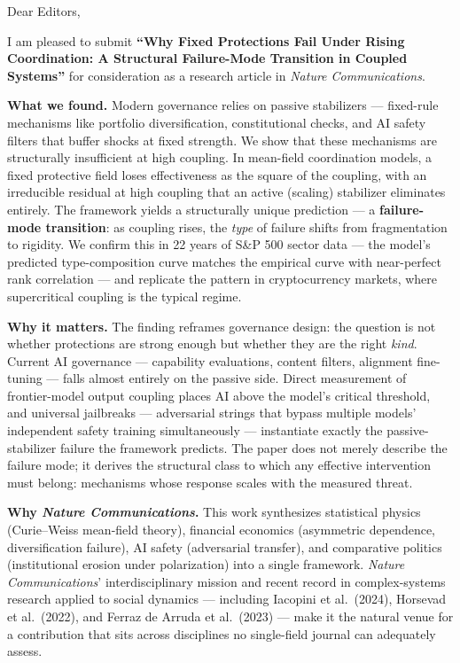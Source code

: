 \documentclass[10pt,letterpaper]{article}
\begin{document}
Dear Editors,

I am pleased to submit \textbf{``Why Fixed Protections Fail Under Rising Coordination: A Structural Failure-Mode Transition in Coupled Systems''} for consideration as a research article in \emph{Nature Communications}.

\textbf{What we found.} Modern governance relies on passive stabilizers --- fixed-rule mechanisms like portfolio diversification, constitutional checks, and AI safety filters that buffer shocks at fixed strength. We show that these mechanisms are structurally insufficient at high coupling. In mean-field coordination models, a fixed protective field loses effectiveness as the square of the coupling, with an irreducible residual at high coupling that an active (scaling) stabilizer eliminates entirely. The framework yields a structurally unique prediction --- a \textbf{failure-mode transition}: as coupling rises, the \emph{type} of failure shifts from fragmentation to rigidity. We confirm this in 22 years of S\&P 500 sector data --- the model's predicted type-composition curve matches the empirical curve with near-perfect rank correlation --- and replicate the pattern in cryptocurrency markets, where supercritical coupling is the typical regime.

\textbf{Why it matters.} The finding reframes governance design: the question is not whether protections are strong enough but whether they are the right \emph{kind}. Current AI governance --- capability evaluations, content filters, alignment fine-tuning --- falls almost entirely on the passive side. Direct measurement of frontier-model output coupling places AI above the model's critical threshold, and universal jailbreaks --- adversarial strings that bypass multiple models' independent safety training simultaneously --- instantiate exactly the passive-stabilizer failure the framework predicts. The paper does not merely describe the failure mode; it derives the structural class to which any effective intervention must belong: mechanisms whose response scales with the measured threat.

\textbf{Why \emph{Nature Communications}.} This work synthesizes statistical physics (Curie--Weiss mean-field theory), financial economics (asymmetric dependence, diversification failure), AI safety (adversarial transfer), and comparative politics (institutional erosion under polarization) into a single framework. \emph{Nature Communications}' interdisciplinary mission and recent record in complex-systems research applied to social dynamics --- including Iacopini et al.~(2024), Horsevad et al.~(2022), and Ferraz de Arruda et al.~(2023) --- make it the natural venue for a contribution that sits across disciplines no single-field journal can adequately assess.
\end{document}
